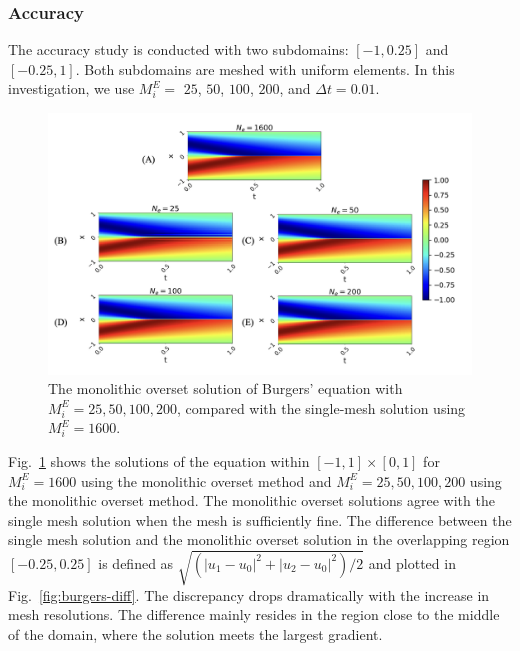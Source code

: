 \documentclass[preprint,12pt,sort&compress]{elsarticle}
\theoremstyle{definition}%
\begin{document}
\subsubsection{Accuracy}
The accuracy study is conducted with two subdomains: $[-1, 0.25]$ and $[-0.25, 1]$. 
Both subdomains are meshed with uniform elements. In this investigation, 
we use $M^E_i=$ $25$, $50$, $100$, $200$, and $\Delta t=0.01$. \\
\begin{figure}[!htbp]
	\centering
	\includegraphics[angle=0,width=1.\textwidth]{fig/burgers-sol.png}
	\caption{The monolithic overset solution of Burgers' equation with $M^E_i=25,50,100,200$, compared with the single-mesh solution using $M_i^E=1600$.}
	\label{fig:burgers-fullfield}
\end{figure}
Fig.~\ref{fig:burgers-fullfield} shows the solutions of the equation within $[-1, 1]\times[0,1]$ for $M^E_i=1600$ using the monolithic overset method and $M_i^E=25,50,100,200$ using the monolithic overset method.
The monolithic overset solutions agree with the single mesh solution when the mesh is sufficiently fine.
The difference between the single mesh solution and the monolithic overset solution in the overlapping region $[-0.25, 0.25]$ is defined as $\sqrt{ (|u_1-u_0|^2+|u_2-u_0|^2)/2}$ and plotted in Fig.~\ref{fig:burgers-diff}.
The discrepancy drops dramatically with the increase in mesh resolutions.
The difference mainly resides in the region close to the middle of the domain, where the solution meets the largest gradient.\\ 
\end{document}
